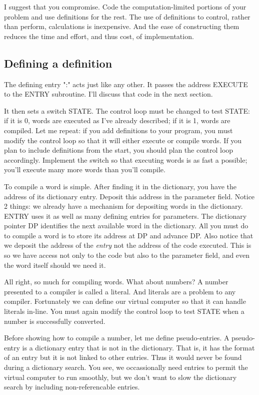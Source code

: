 \documentclass[b5paper, oneside]{book}
\begin{document}
I suggest that you compromise. Code the computation-limited portions of your problem and use definitions for the rest. The use of definitions to control, rather than perform, calculations is inexpensive. And the ease of constructing them reduces the time and effort, and thus cost, of implementation.

\subsection{Defining a definition}
The defining entry ":" acts just like any other. It passes the address EXECUTE to the ENTRY subroutine. I'll discuss that code in the next section.

It then sets a switch STATE. The control loop must be changed to test STATE: if it is 0, words are executed as I've already described; if it is 1, words are compiled. Let me repeat: if you add definitions to your program, you must modify the control loop so that it will either execute or compile words. If you plan to include definitions from the start, you should plan the control loop accordingly. Implement the switch so that executing words is as fast a possible; you'll execute many more words than you'll compile.

To compile a word is simple. After finding it in the dictionary, you have the address of its dictionary entry. Deposit this address in the parameter field. Notice 2 things: we already have a mechanism for depositing words in the dictionary. ENTRY uses it as well as many defining entries for parameters. The dictionary pointer DP identifies the next available word in the dictionary. All you must do to compile a word is to store its address at DP and advance DP. Also notice that we deposit the address of the {\em entry} not the address of the code executed. This is so we have access not only to the code but also to the parameter field, and even the word itself should we need it.

All right, so much for compiling words. What about numbers? A number presented to a compiler is called a literal. And literals are a problem to any compiler. Fortunately we can define our virtual computer so that it can handle literals in-line. You must again modify the control loop to test STATE when a number is successfully converted.

Before showing how to compile a number, let me define pseudo-entries. A pseudo-entry is a dictionary entry that is not in the dictionary. That is, it has the format of an entry but it is not linked to other entries. Thus it would never be found during a dictionary search. You see, we occassionally need entries to permit the virtual computer to run smoothly, but we don't want to slow the dictionary search by including non-referencable entries.
\end{document}
